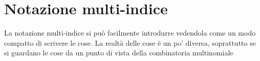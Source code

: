 \documentclass[main.tex]{subfiles}
\begin{document}
\chapter{Notazione multi-indice}
	La notazione multi-indice si può facilmente introdurre vedendola come un modo compatto di scrivere le cose. La realtà delle cose è un po' diversa, soprattutto se si guardano le cose da un punto di vista della combinatoria multinomiale
\end{document}

